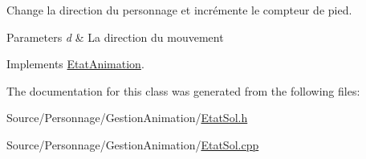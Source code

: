 Change la direction du personnage et incrémente le compteur de pied. 


\begin{DoxyParams}{Parameters}
{\em d} & La direction du mouvement \\
\hline
\end{DoxyParams}


Implements \hyperlink{classEtatAnimation_a09e0277b2679249f33e6b95047cb9378}{Etat\-Animation}.



The documentation for this class was generated from the following files\-:\begin{DoxyCompactItemize}
\item 
Source/\-Personnage/\-Gestion\-Animation/\hyperlink{EtatSol_8h}{Etat\-Sol.\-h}\item 
Source/\-Personnage/\-Gestion\-Animation/\hyperlink{EtatSol_8cpp}{Etat\-Sol.\-cpp}\end{DoxyCompactItemize}
